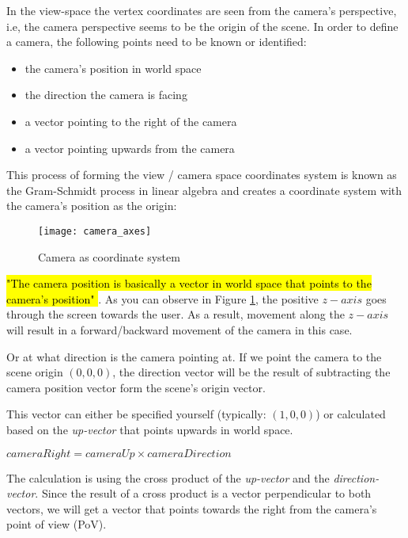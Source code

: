 In the \gls{view-space} the vertex coordinates are seen from the camera's perspective, i.e, the camera perspective seems to be the origin of the scene. \newline
In order to define a camera, the following points need to be known or identified: 
\begin{itemize}
	\item the camera's position in world space
	\item the direction the camera is facing
	\item a vector pointing to the right of the camera
	\item a vector pointing upwards from the camera
\end{itemize} 
This process of forming the view / camera space coordinates system is known as the Gram-Schmidt process \cite{gramprocess} in linear algebra and creates a coordinate system with the camera's position as the origin:
\begin{figure}[h!]
	\centering
	\texttt{[image: camera\_axes]}
	\caption{Camera as coordinate system \cite{cameraopengl}}
	\label{fig:camera-opengl}
\end{figure}


\hl{"The camera position is basically a vector in world space that points to the camera's position" \cite{cameraopengl}}.
As you can observe in Figure \ref{fig:camera-opengl}, the positive $z-axis$ goes through the screen towards the user. As a result, movement along the $z-axis$ will result in a forward/backward movement of the camera in this case.


Or at what direction is the camera pointing at. If we point the camera to the scene origin $(0, 0, 0)$, the direction vector will be the result of subtracting the camera position vector form the scene's origin vector.


This vector can either be specified yourself (typically: $(1, 0, 0)$) or calculated based on the \emph{up-vector} that points upwards in world space.

\centerline{$cameraRight = cameraUp \times cameraDirection$}

The calculation is using the cross product of the \emph{up-vector} and the \emph{direction-vector}. Since the result of a cross product is a vector perpendicular to both vectors, we will get a vector that points towards the right from the camera's point of view (PoV).

